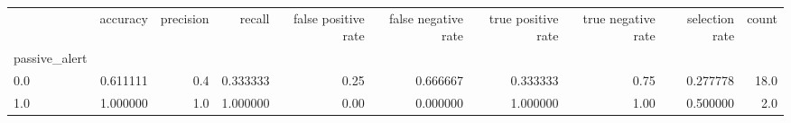 \begin{tabular}{lrrrrrrrrr}
\toprule
{} &  accuracy &  precision &    recall &  false positive rate &  false negative rate &  true positive rate &  true negative rate &  selection rate &  count \\
passive\_alert &           &            &           &                      &                      &                     &                     &                 &        \\
\midrule
0.0           &  0.611111 &        0.4 &  0.333333 &                 0.25 &             0.666667 &            0.333333 &                0.75 &        0.277778 &   18.0 \\
1.0           &  1.000000 &        1.0 &  1.000000 &                 0.00 &             0.000000 &            1.000000 &                1.00 &        0.500000 &    2.0 \\
\bottomrule
\end{tabular}
